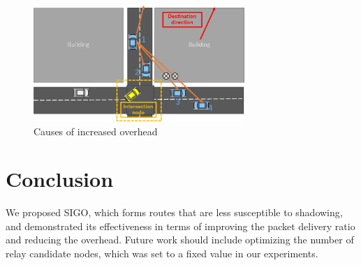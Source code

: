 \documentclass[conference]{IEEEtran}
\begin{document}
\begin{figure}[!ht]
\centering
\includegraphics[width=80mm]{figures/overhead_reason.eps}
\caption{Causes of increased overhead}
\label{fig:overhead_reason}
\end{figure}



\section{Conclusion}
\label{conclusion}
We proposed SIGO, which forms routes that are less susceptible to shadowing, and demonstrated its effectiveness in terms of improving the packet delivery ratio and reducing the overhead. 
Future work should include optimizing the number of relay candidate nodes, which was set to a fixed value in  our experiments. 





\end{document}
